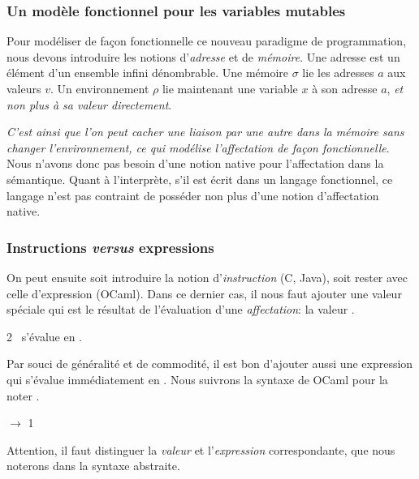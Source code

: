 %
\begin{frame}
\frametitle{Un modèle fonctionnel pour les variables mutables}

Pour modéliser de façon fonctionnelle ce nouveau paradigme de
programmation, nous devons introduire les notions d'\emph{adresse} et
de \emph{mémoire}. Une adresse est un élément d'un ensemble infini
dénombrable. Une mémoire $\sigma$ lie les adresses $a$ aux valeurs
$v$. Un environnement $\rho$ lie maintenant une variable $x$ à son
adresse $a$, \emph{et non plus à sa valeur directement}.

\bigskip

\emph{C'est ainsi que l'on peut cacher une liaison par une autre
dans la mémoire sans changer l'environnement, ce qui modélise
l'affectation de façon fonctionnelle}. Nous n'avons donc pas besoin d'une
notion native pour l'affectation dans la sémantique. Quant à
l'interprète, s'il est écrit dans un langage fonctionnel, ce langage
n'est pas contraint de posséder non plus d'une notion d'affectation
native.

\end{frame}

%
\begin{frame}
\frametitle{Instructions \emph{versus} expressions}

On peut ensuite soit introduire la notion d'\emph{instruction} (C,
Java), soit rester avec celle d'expression (OCaml). Dans ce dernier
cas, il nous faut ajouter une valeur spéciale qui est le résultat de
l'évaluation d'une \emph{affectation}: la valeur .

\bigskip

\exemple \quad {} \assign \num{2} \ s'évalue en .

\bigskip

Par souci de généralité et de commodité, il est bon d'ajouter aussi
une expression qui s'évalue immédiatement en . Nous
suivrons la syntaxe de OCaml pour la noter \lpar\rpar.

\bigskip

\exemple \quad \Xlet {} \equal \Xfun {} $\rightarrow$ \num{1}
\Xin {} \lpar\rpar

\bigskip

Attention, il faut distinguer la \emph{valeur}  et
l'\emph{expression} correspondante, que nous noterons  dans
la syntaxe abstraite.

\end{frame}

